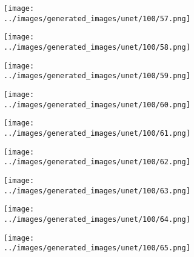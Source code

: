 \begin{figure}[H]
\hspace{1em}%
\begin{subfigure}[b]{0.1\textwidth}
\centering
\texttt{[image: ../images/generated\_images/unet/100/57.png]}
\end{subfigure}
\hspace{1em}%
\begin{subfigure}[b]{0.1\textwidth}
\centering
\texttt{[image: ../images/generated\_images/unet/100/58.png]}
\end{subfigure}
\hspace{1em}%
\begin{subfigure}[b]{0.1\textwidth}
\centering
\texttt{[image: ../images/generated\_images/unet/100/59.png]}
\end{subfigure}
\hspace{1em}%
\begin{subfigure}[b]{0.1\textwidth}
\centering
\texttt{[image: ../images/generated\_images/unet/100/60.png]}
\end{subfigure}
\hspace{1em}%
\begin{subfigure}[b]{0.1\textwidth}
\centering
\texttt{[image: ../images/generated\_images/unet/100/61.png]}
\end{subfigure}
\hspace{1em}%
\begin{subfigure}[b]{0.1\textwidth}
\centering
\texttt{[image: ../images/generated\_images/unet/100/62.png]}
\end{subfigure}
\hspace{1em}%
\begin{subfigure}[b]{0.1\textwidth}
\centering
\texttt{[image: ../images/generated\_images/unet/100/63.png]}
\end{subfigure}
\hspace{1em}%
\begin{subfigure}[b]{0.1\textwidth}
\centering
\texttt{[image: ../images/generated\_images/unet/100/64.png]}
\end{subfigure}
\hspace{1em}%
\begin{subfigure}[b]{0.1\textwidth}
\centering
\texttt{[image: ../images/generated\_images/unet/100/65.png]}
\end{subfigure}
\hspace{1em}%
\begin{subfigure}[b]{0.1\textwidth}

\end{subfigure}
\end{figure}
